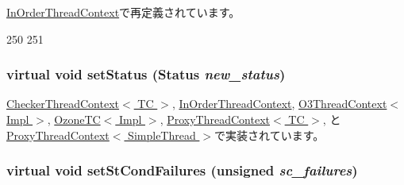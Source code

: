 \hyperlink{classInOrderThreadContext_ae9e72cf93b574d00d7f1652fcafe7449}{InOrderThreadContext}で再定義されています。


\begin{DoxyCode}
250     {
251     }
\end{DoxyCode}
\hypertarget{classThreadContext_ab09e388dd57fd5b8e05da30473b0a859}{
\subsubsection[{setStatus}]{\setlength{\rightskip}{0pt plus 5cm}virtual void setStatus ({\bf Status} {\em new\_\-status})}}
\label{classThreadContext_ab09e388dd57fd5b8e05da30473b0a859}


\hyperlink{classCheckerThreadContext_acdf331c877974ed8697216475a21998d}{CheckerThreadContext$<$ TC $>$}, \hyperlink{classInOrderThreadContext_acdf331c877974ed8697216475a21998d}{InOrderThreadContext}, \hyperlink{classO3ThreadContext_afd2e0894c5e6d90253525390acf6e6dd}{O3ThreadContext$<$ Impl $>$}, \hyperlink{classOzoneCPU_1_1OzoneTC_acdf331c877974ed8697216475a21998d}{OzoneTC$<$ Impl $>$}, \hyperlink{classProxyThreadContext_acdf331c877974ed8697216475a21998d}{ProxyThreadContext$<$ TC $>$}, と \hyperlink{classProxyThreadContext_acdf331c877974ed8697216475a21998d}{ProxyThreadContext$<$ SimpleThread $>$}で実装されています。\hypertarget{classThreadContext_aaa3506321089a0ec9c36d9ceff17c346}{
\subsubsection[{setStCondFailures}]{\setlength{\rightskip}{0pt plus 5cm}virtual void setStCondFailures (unsigned {\em sc\_\-failures})}}
\label{classThreadContext_aaa3506321089a0ec9c36d9ceff17c346}


